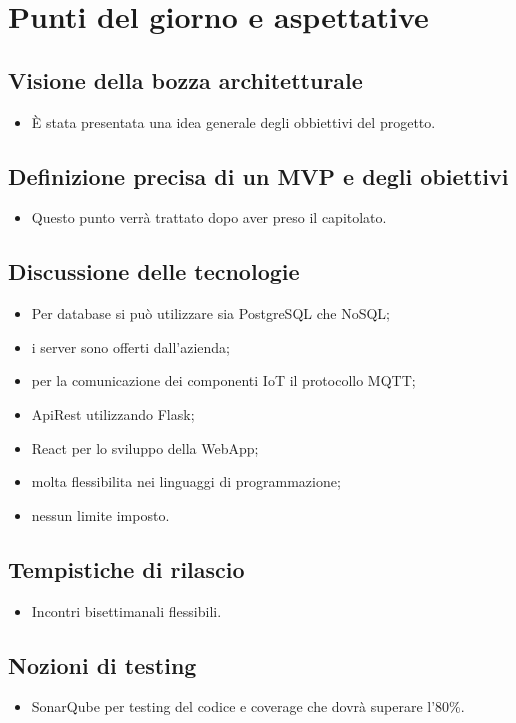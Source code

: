 \section{Punti del giorno e aspettative}

    \subsection{Visione della bozza architetturale}
    \begin{itemize}
        \item È stata presentata una idea generale degli obbiettivi del progetto.
    \end{itemize}
    \subsection{Definizione precisa di un MVP e degli obiettivi}
    \begin{itemize}
        \item Questo punto verrà trattato dopo aver preso il capitolato.
    \end{itemize}
    \subsection{Discussione delle tecnologie}
    \begin{itemize}
        \item Per database si può utilizzare sia PostgreSQL che NoSQL;
        \item i server sono offerti dall'azienda;
        \item per la comunicazione dei componenti IoT il protocollo MQTT;
        \item ApiRest utilizzando Flask;
        \item React per lo sviluppo della WebApp;
        \item molta flessibilita nei linguaggi di programmazione;
        \item nessun limite imposto.
    \end{itemize}
    \subsection{Tempistiche di rilascio}
    \begin{itemize}
        \item Incontri bisettimanali flessibili.
    \end{itemize}
    \subsection{Nozioni di testing}
    \begin{itemize}
        \item SonarQube per testing del codice e coverage che dovrà superare l'80\%.
    \end{itemize}
